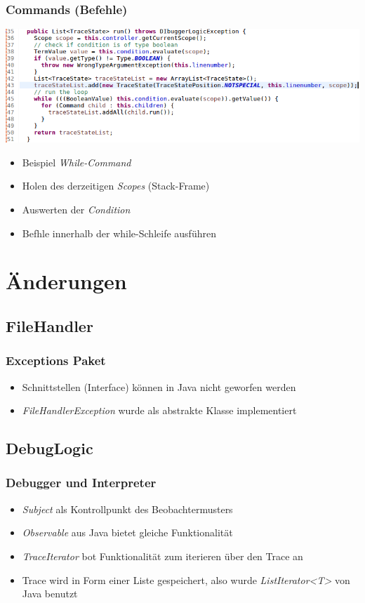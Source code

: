 \documentclass{beamer}
\begin{document}
\begin{frame}
\frametitle{Commands (Befehle)}
\includegraphics[scale=0.3]{../document_data/runWhile.png}
\begin{itemize}
\item Beispiel \textit{While-Command}
\item Holen des derzeitigen \textit{Scopes} (Stack-Frame)
\item Auswerten der \textit{Condition}
\item Befhle innerhalb der while-Schleife ausführen
\end{itemize}
\end{frame}

\section{Änderungen}
\subsection{FileHandler}
\begin{frame}
\frametitle{Exceptions Paket}
\begin{itemize}
\item Schnittstellen (Interface) können in Java nicht geworfen werden
\item \textit{FileHandlerException} wurde als abstrakte Klasse implementiert
\end{itemize}
\end{frame}

\subsection{DebugLogic}
\begin{frame}
\frametitle{Debugger und Interpreter}
\begin{itemize}
\item \textit{Subject} als Kontrollpunkt des Beobachtermusters
\item \textit{Observable} aus Java bietet gleiche Funktionalität
\item \textit{TraceIterator} bot Funktionalität zum iterieren über den Trace an
\item Trace wird in Form einer Liste gespeichert, also wurde \textit{ListIterator<T>} von Java benutzt
\end{itemize}
\end{frame}
\end{document}
